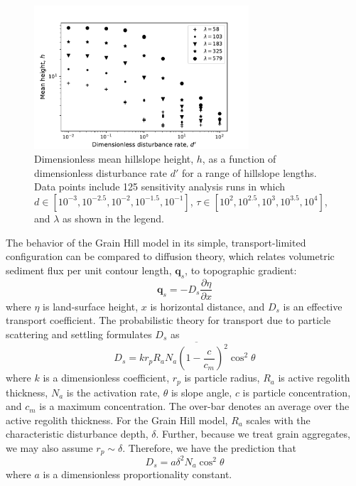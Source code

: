\documentclass[esurf, manuscript]{copernicus}
\begin{document}
\begin{figure}[t]
\includegraphics[width=8cm]{Figures/mean_ht_vs_dist_rate.pdf}
\caption{Dimensionless mean hillslope height, $h$, as a function of dimensionless disturbance rate $d'$ for a range of hillslope lengths. Data points include 125 sensitivity analysis runs in which $d\in [10^{-3},10^{-2.5},10^{-2},10^{-1.5},10^{-1}]$, $\tau\in [10^2, 10^{2.5}, 10^3, 10^{3.5}, 10^4]$, and $\lambda$ as shown in the legend.}
\label{tlimscaling}
\end{figure}




The behavior of the Grain Hill model in its simple, transport-limited configuration can be compared to diffusion theory, which relates volumetric sediment flux per unit contour length, $\mathbf{q}_s$, to topographic gradient:
\begin{equation}
\mathbf{q}_s = -D_s \frac{\partial \eta}{\partial x}
\label{qs}
\end{equation}
where $\eta$ is land-surface height, $x$ is horizontal distance, and $D_s$ is an effective transport coefficient. The \citet{furbish2009statistical} probabilistic theory for transport due to particle scattering and settling formulates $D_s$ as
\begin{equation}
D_s = k r_p R_a \overline{N_a \left( 1 - \frac{c}{c_m}\right)^2} \cos^2 \theta
\end{equation}
where $k$ is a dimensionless coefficient, $r_p$ is particle radius, $R_a$ is active regolith thickness, $N_a$ is the activation rate, $\theta$ is slope angle, $c$ is particle concentration, and $c_m$ is a maximum concentration. The over-bar denotes an average over the active regolith thickness. For the Grain Hill model, $R_a$ scales with the characteristic disturbance depth, $\delta$. Further, because we treat grain aggregates, we may also assume $r_p\sim \delta$. Therefore, we have the prediction that
\begin{equation}
D_s = a \delta^2 N_a \cos^2 \theta
\label{D}
\end{equation}
where $a$ is a dimensionless proportionality constant.  
\end{document}
